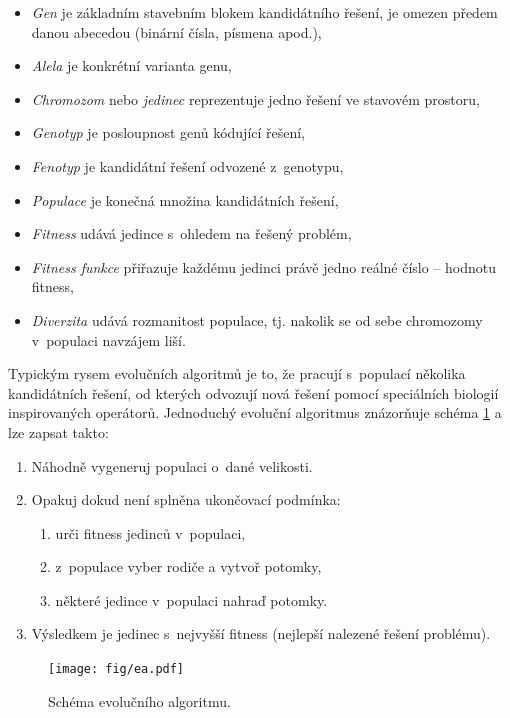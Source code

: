 \begin{itemize}
    \item\emph{Gen} je základním stavebním blokem kandidátního řešení, je omezen předem danou abecedou (binární čísla, písmena apod.),
    \item\emph{Alela} je konkrétní varianta genu,
    \item\emph{Chromozom} nebo \emph{jedinec} reprezentuje jedno řešení ve stavovém prostoru,
    \item\emph{Genotyp} je posloupnost genů kódující řešení,
    \item\emph{Fenotyp} je kandidátní řešení odvozené z~genotypu,
    \item\emph{Populace} je konečná množina kandidátních řešení,
    \item\emph{Fitness} udává  jedince s~ohledem na řešený problém,
    \item\emph{Fitness funkce} přiřazuje každému jedinci právě jedno reálné číslo -- hodnotu fitness,
    \item\emph{Diverzita} udává rozmanitost populace, tj. nakolik se od sebe chromozomy v~populaci navzájem liší.
\end{itemize}

Typickým rysem evolučních algoritmů je to, že pracují s~populací několika kandidátních řešení, od kterých odvozují nová řešení pomocí speciálních biologií inspirovaných operátorů. Jednoduchý evoluční algoritmus znázorňuje schéma \ref{obrEA} a lze zapsat takto:

\begin{enumerate}
    \item Náhodně vygeneruj populaci o~dané velikosti.
    \item Opakuj dokud není splněna ukončovací podmínka:
    \begin{enumerate}
        \item urči fitness jedinců v~populaci,
        \item z~populace vyber rodiče a vytvoř potomky,
        \item některé jedince v~populaci nahraď potomky.
    \end{enumerate}
    \item Výsledkem je jedinec s~nejvyšší fitness (nejlepší nalezené řešení problému).
\end{enumerate}

\begin{figure}[htb]
    \centering\texttt{[image: fig/ea.pdf]}
    \caption{Schéma evolučního algoritmu.}
    \label{obrEA}
\end{figure}

